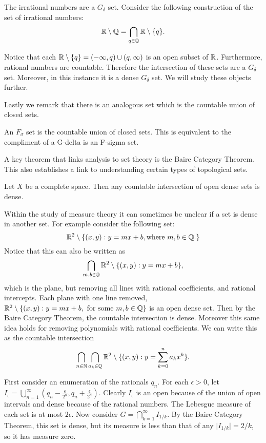 \begin{example}
    The irrational numbers are a $G_\delta$ set.  Consider the following construction of the set of irrational numbers:
    $$\mathbb{R} \setminus \mathbb{Q} = \bigcap_{q \in \mathbb{Q}}\mathbb{R} \setminus \{q\}.$$
\end{example}
Notice that each $\mathbb{R}\setminus \{q\} = (-\infty, q) \cup (q, \infty)$ is an open subset of $\mathbb{R}$.  Furthermore, rational numbers are countable.  Therefore the intersection of these sets are a $G_\delta$ set.  Moreover, in this instance it is a dense $G_\delta$ set.  We will study these objects further.  

Lastly we remark that there is an analogous set which is the countable union of closed sets.
\begin{definition}
    An $F_\sigma$ set is the countable union of closed sets.  This is equivalent to the compliment of a G-delta is an F-sigma set.  
\end{definition}

A key theorem that links analysis to set theory is the Baire Category Theorem.  This also establishes a link to understanding certain types of topological sets.  
\begin{theorem}
    Let $X$ be a complete space.  Then any countable intersection of open dense sets is dense.  
\end{theorem}

Within the study of measure theory it can sometimes be unclear if a set is dense in another set.  For example consider the following set: 
$$\mathbb{R}^2 \setminus \{(x,y): y=mx + b, \text{where $m, b \in \mathbb{Q}$.}\}$$
Notice that this can also be written as $$\bigcap_{m,b \in \mathbb{Q}} \mathbb{R}^2 \setminus \{(x,y): y=mx+b\}, $$ which is the plane, but removing all lines with rational coefficients, and rational intercepts.  Each plane with one line removed, $\mathbb{R}^2 \setminus \{(x,y) : y=mx+b, \text{ for some } m,b \in \mathbb{Q}\}$ is an open dense set.  Then by the Baire Category Theorem, the countable intersection is dense.  Moreover this same idea holds for removing polynomials with rational coefficients.  We can write this as the countable intersection 
$$\bigcap_{n\in \mathbb{N}}\bigcap_{a_k \in \mathbb{Q}}\mathbb{R}^2 \setminus \{(x,y): y = \sum_{k=0}^n a_kx^k\}.$$


\begin{example}
     First consider an enumeration of the rationals $q_n.$  For each $\epsilon > 0$, let $I_\epsilon = \bigcup_{n=1}^\infty (q_n - \frac{\epsilon}{2^n}, q_n + \frac{\epsilon}{2^n})$.  Clearly $I_\epsilon$ is an open because of the union of open intervals and dense because of the rational numbers.  The Lebesgue measure of each set is at most $2\epsilon$.  Now consider $G = \bigcap_{k=1}^\infty I_{1/k}$.  By the Baire Category Theorem, this set is dense, but its measure is less than that of any $\vert I_{1/k} \vert = 2/k $, so it has measure zero.
\end{example}

